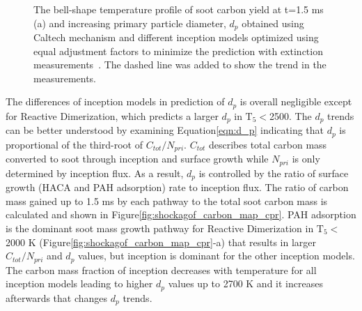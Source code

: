 \begin{figure}[H]
	\centering
	\caption{The bell-shape temperature profile of soot carbon yield at t=1.5 ms (a) and increasing primary particle diameter, $d_p$ obtained using Caltech mechanism and different inception models optimized using equal adjustment factors to minimize the prediction with extinction measurements~\citep{agafonov2016unified}. The dashed line was added to show the trend in the measurements.}
	\label{fig:shockagof_yield_dp_cpr} 
\end{figure}


The differences of inception models in prediction of $d_p$  is overall negligible except for Reactive Dimerization, which predicts a larger $d_p$ in $\mathrm{T_5}<$2500. The $d_p$ trends can be better understood by examining Equation\eqref{eqn:d_p} indicating that $d_p$ is proportional of the third-root of $C_{tot}/N_{pri}$. $C_{tot}$ describes total carbon mass converted to soot through inception and surface growth while $N_{pri}$ is only determined by inception flux. As a result, $d_p$ is controlled by the ratio of surface growth (HACA and PAH adsorption) rate to inception flux. The ratio of carbon mass gained up to 1.5 ms by each pathway to the total soot carbon mass is calculated and shown in Figure\ref{fig:shockagof_carbon_map_cpr}. PAH adsorption is the dominant soot mass growth pathway for Reactive Dimerization in $\mathrm{T_5}<$2000 K (Figure\ref{fig:shockagof_carbon_map_cpr}-a) that results in larger $C_{tot}/N_{pri}$ and $d_p$ values, but inception is dominant for the other inception models. The carbon mass fraction of inception decreases with temperature for all inception models leading to higher $d_p$ values up to 2700 K and it increases afterwards that changes $d_p$ trends.


